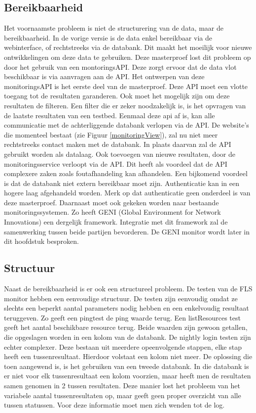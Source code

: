 \subsection{Bereikbaarheid}
\npar
Het voornaamste probleem is niet de structurering van de data, maar de bereikbaarheid. In de vorige versie is de data enkel bereikbaar via de webinterface, of rechtstreeks via de databank. Dit maakt het moeilijk voor nieuwe ontwikkelingen om deze data te gebruiken. Deze masterproef lost dit probleem op door het gebruik van een montoringsAPI. Deze zorgt ervoor dat de data vlot beschikbaar is via aanvragen aan de API.
\npar
Het ontwerpen van deze monitoringsAPI is het eerste deel van de masterproef. Deze API moet een vlotte toegang tot de resultaten garanderen. Ook moet het mogelijk zijn om deze resultaten de filteren. Een filter die er zeker noodzakelijk is, is het opvragen van de laatste resultaten van een testbed. Eenmaal deze api af is, kan alle communicatie met de achterliggende databank verlopen via de API. De website's die momenteel bestaat (zie Figuur \ref{monitoringView}), zal nu niet meer rechtstreeks contact maken met de databank. In plaats daarvan zal de API gebruikt worden als datalaag.
\npar
Ook toevoegen van nieuwe resultaten, door de monitoringsservice verloopt via de API. Dit heeft als voordeel dat de API complexere zaken zoals foutafhandeling kan afhandelen. Een bijkomend voordeel is dat de databank niet extern bereikbaar moet zijn. Authenticatie kan in een hogere laag afgehandeld worden. Merk op dat authenticatie geen onderdeel is van deze masterproef.
\npar
Daarnaast moet ook gekeken worden naar bestaande monitoringssystemen. Zo heeft GENI (Global Environment for Network Innovations) een dergelijk framework. Integratie met dit framework zal de samenwerking tussen beide partijen bevorderen. De GENI monitor wordt later in dit hoofdstuk besproken.

\subsection{Structuur}
\npar
Naast de bereikbaarheid is er ook een structureel probleem. De testen van de FLS monitor hebben een eenvoudige structuur. De testen zijn eenvoudig omdat ze slechts een beperkt aantal parameters nodig hebben en een enkelvoudig resultaat teruggeven. Zo geeft een pingtest de ping waarde terug. Een listResources test geeft het aantal beschikbare resource terug. Beide waarden zijn gewoon getallen, die opgeslagen worden in een kolom van de databank.
\clearpage
\npar
De nightly login testen zijn echter complexer. Deze bestaan uit meerdere opeenvolgende stappen, elke stap heeft een tussenresultaat. Hierdoor volstaat een kolom niet meer. De oplossing die toen aangewend is, is het gebruiken van een tweede databank. In die databank is er niet voor elk tussenresultaat een kolom voorzien, maar heeft men de resultaten samen genomen in 2 tussen resultaten. Deze manier lost het probleem van het variabele aantal tussenresultaten op, maar geeft geen proper overzicht van alle tussen statussen. Voor deze informatie moet men zich wenden tot de log.
